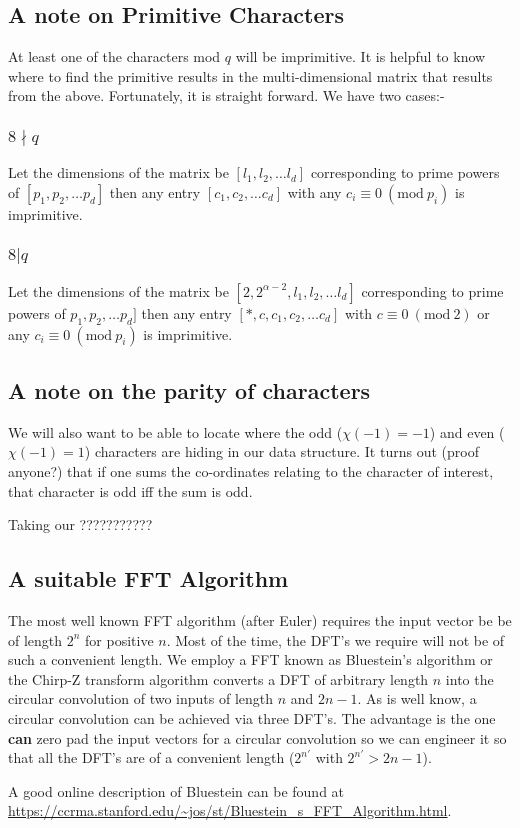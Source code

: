 \documentclass[12pt]{amsart}
\newcommand{\Mod}[1]{\ (\mathrm{mod}\ #1)}
\theoremstyle{remark}
\numberwithin{theorem}{section}
\numberwithin{equation}{section}
\begin{document}
\subsection{A note on Primitive Characters}

At least one of the characters mod $q$ will be imprimitive. It is helpful to know where to find the primitive results in the multi-dimensional matrix that results from the above. Fortunately, it is straight forward. We have two cases:-


\subsubsection{$8\nmid q$}

Let the dimensions of the matrix be $[l_1,l_2,\ldots l_d]$ corresponding to prime powers of $[p_1,p_2,\ldots p_d]$ then any entry $[c_1,c_2,\ldots c_d]$ with any $c_i\equiv 0 \Mod{p_i}$ is imprimitive.

\subsubsection{$8 | q$}

Let the dimensions of the matrix be $[2,2^{\alpha-2},l_1,l_2,\ldots l_d]$ corresponding to prime powers of $p_1,p_2,\ldots p_d]$ then any entry $[*,c,c_1,c_2,\ldots c_d]$ with $c\equiv 0 \Mod{2}$ or any $c_i\equiv 0 \Mod{p_i}$ is imprimitive.

\subsection{A note on the parity of characters}

We will also want to be able to locate where the odd ($\chi(-1)=-1$) and even ($\chi(-1)=1$) characters are hiding in our data structure. It turns out (proof anyone?) that if one sums the co-ordinates relating to the character of interest, that character is odd iff the sum is odd.  

Taking our ???????????
\subsection{A suitable FFT Algorithm}

The most well known FFT algorithm (after Euler) requires the input vector be be of length $2^n$ for positive $n$. Most of the time, the DFT's we require will not be of such a convenient length. We employ a FFT known as Bluestein's algorithm or the Chirp-Z transform algorithm converts a DFT of arbitrary length $n$ into the circular convolution of two inputs of length $n$ and $2n-1$. As is well know, a circular convolution can be achieved via three DFT's. The advantage is the one \textbf{can} zero pad the input vectors for a circular convolution so we can engineer it so that all the DFT's are of a convenient length ($2^{n'}$ with $2^{n'}>2n-1$).

A good online description of Bluestein can be found at \url{https://ccrma.stanford.edu/~jos/st/Bluestein_s_FFT_Algorithm.html}.



\end{document}
